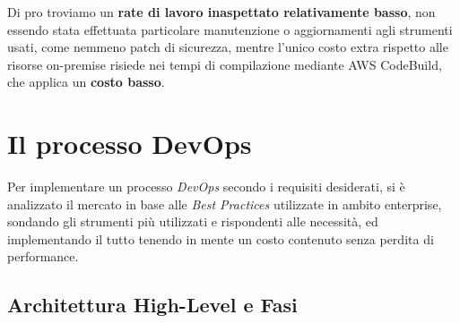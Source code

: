 \documentclass[../main.tex]{subfiles}
\begin{document}
    	    Di pro troviamo un \textbf{rate di lavoro inaspettato relativamente basso}, non essendo stata effettuata particolare manutenzione o aggiornamenti agli strumenti usati, come nemmeno patch di sicurezza, mentre l'unico costo extra rispetto alle risorse on-premise risiede nei tempi di compilazione mediante AWS CodeBuild, che applica un \textbf{costo basso}.
    	   
    	   
    	\section{Il processo DevOps}
	    \label{sec:devops_process}
    	
    	    Per implementare un processo \emph{DevOps} secondo i requisiti desiderati, si è analizzato il mercato in base alle \emph{Best Practices} utilizzate in ambito enterprise, sondando gli strumenti più utilizzati e rispondenti alle necessità, ed implementando il tutto tenendo in mente un costo contenuto senza perdita di performance.
    	
        	\subsection{Architettura High-Level e Fasi}
        	
\end{document}
